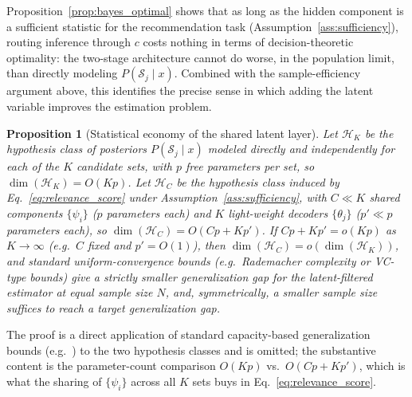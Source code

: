 \documentclass{article}
\theoremstyle{plain}
\newtheorem{proposition}{Proposition}
\theoremstyle{definition}
\theoremstyle{remark}
\begin{document}
Proposition~\ref{prop:bayes_optimal} shows that as long as the hidden component is a sufficient statistic for the recommendation task (Assumption~\ref{ass:sufficiency}), routing inference through $c$ costs nothing in terms of decision-theoretic optimality: the two-stage architecture cannot do worse, in the population limit, than directly modeling $P(\mathcal S_j\mid x)$. Combined with the sample-efficiency argument above, this identifies the precise sense in which adding the latent variable improves the estimation problem.

\begin{proposition}[Statistical economy of the shared latent layer]
	\label{prop:sample_efficiency}
	Let $\mathcal{H}_K$ be the hypothesis class of posteriors $P(\mathcal S_j\mid x)$ modeled directly and independently for each of the $K$ candidate sets, with $p$ free parameters per set, so $\dim(\mathcal H_K)=O(Kp)$. Let $\mathcal{H}_C$ be the hypothesis class induced by Eq.~\eqref{eq:relevance_score} under Assumption~\ref{ass:sufficiency}, with $C\ll K$ shared components $\{\psi_i\}$ ($p$ parameters each) and $K$ light-weight decoders $\{\theta_j\}$ ($p'\ll p$ parameters each), so $\dim(\mathcal H_C) = O(Cp + Kp')$. If $C p + K p' = o(Kp)$ as $K\to\infty$ (e.g.\ $C$ fixed and $p'=O(1)$), then $\dim(\mathcal H_C) = o(\dim(\mathcal H_K))$, and standard uniform-convergence bounds (e.g.\ Rademacher complexity or VC-type bounds) give a strictly smaller generalization gap for the latent-filtered estimator at equal sample size $N$, and, symmetrically, a smaller sample size suffices to reach a target generalization gap.
\end{proposition}

The proof is a direct application of standard capacity-based generalization bounds (e.g.\ \citealt{bartlett2002rademacher}) to the two hypothesis classes and is omitted; the substantive content is the parameter-count comparison $O(Kp)$ vs.\ $O(Cp+Kp')$, which is what the sharing of $\{\psi_i\}$ across all $K$ sets buys in Eq.~\eqref{eq:relevance_score}.
\end{document}
